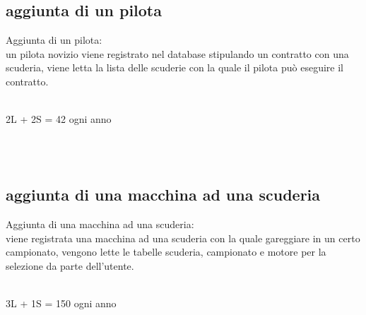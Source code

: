 \documentclass[a4paper,12pt]{report}
\begin{document}
	\subsection{aggiunta di un pilota}
	Aggiunta di un pilota:\\
	un pilota novizio viene registrato nel database stipulando un contratto con una scuderia,
	viene letta la lista delle scuderie con la quale il pilota può eseguire il contratto.
	\begin{table}[!htb]
		\centering
		\begin{center}
		\newline\\
		2L + 2S = 42 ogni anno\\
		\end{center}
	\end{table}\\\\
	\subsection{aggiunta di una macchina ad una scuderia}
	Aggiunta di una macchina ad una scuderia:\\
	viene registrata una macchina ad una scuderia con la quale gareggiare in un certo campionato,
	vengono lette le tabelle scuderia, campionato e motore per la selezione da parte dell'utente.
	\begin{table}[!htb]
		\centering
		\begin{center}
		\newline\\
		3L + 1S = 150 ogni anno\\
		\end{center}
	\end{table}\\
	\newpage
\end{document}
